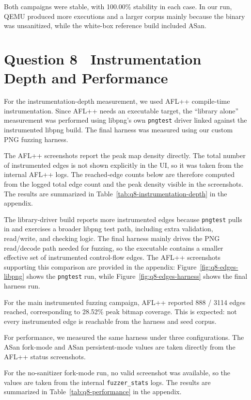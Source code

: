 \documentclass[letterpaper,twocolumn,10pt]{article}
\begin{document}
Both campaigns were stable, with 100.00\% stability in each case. In our run,
QEMU produced more executions and a larger corpus mainly because the binary was
unsanitized, while the white-box reference build included ASan.

\section{Question 8 \textendash\ Instrumentation Depth and Performance}
\label{sec:q8}

For the instrumentation-depth measurement, we used AFL++ compile-time
instrumentation. Since AFL++ needs an executable target, the ``library alone''
measurement was performed using libpng's own \texttt{pngtest} driver linked
against the instrumented libpng build. The final harness was measured using our
custom PNG fuzzing harness.

The AFL++ screenshots report the peak map density directly. The total number of
instrumented edges is not shown explicitly in the UI, so it was taken from the
internal AFL++ logs. The reached-edge counts below are therefore computed from
the logged total edge count and the peak density visible in the screenshots.
The results are summarized in Table~\ref{tab:q8-instrumentation-depth} in the appendix.


The library-driver build reports more instrumented edges because
\texttt{pngtest} pulls in and exercises a broader libpng test path, including
extra validation, read/write, and checking logic. The final harness mainly drives
the PNG read/decode path needed for fuzzing, so the executable contains a
smaller effective set of instrumented control-flow edges. The AFL++ screenshots
supporting this comparison are provided in the appendix:
Figure~\ref{fig:q8-edges-libpng} shows the \texttt{pngtest} run, while
Figure~\ref{fig:q8-edges-harness} shows the final harness run.

For the main instrumented fuzzing campaign, 
AFL++ reported 888 / 3114 edges reached, corresponding to 28.52\% peak bitmap
coverage. This is expected: not every instrumented edge is reachable from the
harness and seed corpus. 

For performance, we measured the same harness under three configurations. The
ASan fork-mode and ASan persistent-mode values are taken directly from the AFL++
status screenshots. 

For the no-sanitizer fork-mode run, no valid screenshot was available, so the values are taken from the internal \texttt{fuzzer\_stats} logs.
The results are summarized in Table~\ref{tab:q8-performance} in the appendix.
\end{document}
